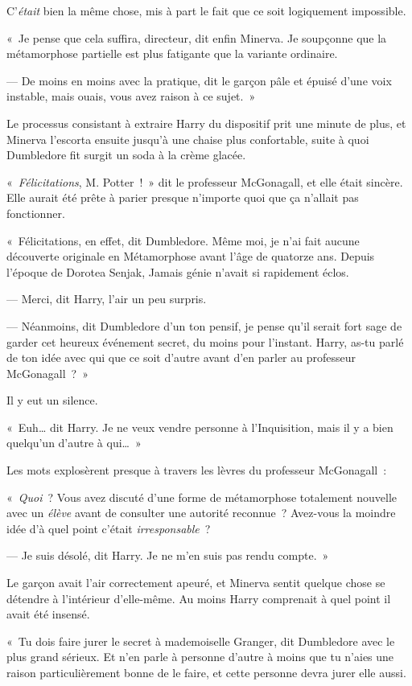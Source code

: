 C'\emph{était} bien la même chose, mis à part le fait que ce soit logiquement impossible.

«~Je pense que cela suffira, directeur, dit enfin Minerva. Je soupçonne que la métamorphose partielle est plus fatigante que la variante ordinaire.

--- De moins en moins avec la pratique, dit le garçon pâle et épuisé d'une voix instable, mais ouais, vous avez raison à ce sujet.~»

Le processus consistant à extraire Harry du dispositif prit une minute de plus, et Minerva l'escorta ensuite jusqu'à une chaise plus confortable, suite à quoi Dumbledore fit surgit un soda à la crème glacée.

«~\emph{Félicitations}, M. Potter~!~» dit le professeur McGonagall, et elle était sincère. Elle aurait été prête à parier presque n'importe quoi que ça n'allait pas fonctionner.

«~Félicitations, en effet, dit Dumbledore. Même moi, je n'ai fait aucune découverte originale en Métamorphose avant l'âge de quatorze ans. Depuis l'époque de Dorotea Senjak, Jamais génie n'avait si rapidement éclos.

--- Merci, dit Harry, l'air un peu surpris.

--- Néanmoins, dit Dumbledore d'un ton pensif, je pense qu'il serait fort sage de garder cet heureux événement secret, du moins pour l'instant. Harry, as-tu parlé de ton idée avec qui que ce soit d'autre avant d'en parler au professeur McGonagall~?~»

Il y eut un silence.

«~Euh… dit Harry. Je ne veux vendre personne à l'Inquisition, mais il y a bien quelqu'un d'autre à qui…~»

Les mots explosèrent presque à travers les lèvres du professeur McGonagall~:

«~\emph{Quoi}~? Vous avez discuté d'une forme de métamorphose totalement nouvelle avec un \emph{élève} avant de consulter une autorité reconnue~? Avez-vous la moindre idée d'à quel point c'était \emph{irresponsable}~?

--- Je suis désolé, dit Harry. Je ne m'en suis pas rendu compte.~»

Le garçon avait l'air correctement apeuré, et Minerva sentit quelque chose se détendre à l'intérieur d'elle-même. Au moins Harry comprenait à quel point il avait été insensé.

«~Tu dois faire jurer le secret à mademoiselle Granger, dit Dumbledore avec le plus grand sérieux. Et n'en parle à personne d'autre à moins que tu n'aies une raison particulièrement bonne de le faire, et cette personne devra jurer elle aussi.

